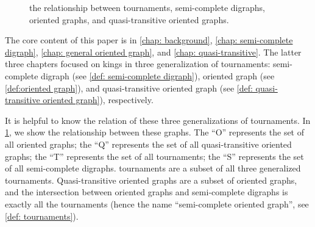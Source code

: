 \begin{figure}
  \centering
  \caption{the relationship between tournaments,
    semi-complete digraphs, oriented graphs,
    and quasi-transitive oriented graphs.}
  \label{fig: generalized tournaments relationship}  %
\end{figure}

The core content of this paper is in
\cref{chap: background}, \cref{chap: semi-complete digraph},
\cref{chap: general oriented graph},
and \cref{chap: quasi-transitive}.
The latter three chapters focused on kings in
three generalization of tournaments:
semi-complete digraph (see \cref{def: semi-complete digraph}),
oriented graph (see \cref{def:oriented graph}),
and quasi-transitive oriented graph
(see \cref{def: quasi-transitive oriented graph}),
respectively.

It is helpful to know the relation of these
three generalizations of tournaments.
In \cref{fig: generalized tournaments relationship},
we show the relationship between these graphs.
The ``O'' represents the set of all oriented graphs;
the ``Q'' represents the set of all quasi-transitive oriented graphs;
the ``T'' represents the set of all tournaments;
the ``S'' represents the set of all semi-complete digraphs.
tournaments are a subset of all three generalized tournaments.
Quasi-transitive oriented graphs are a subset of oriented graphs,
and the intersection between oriented graphs and
semi-complete digraphs is exactly all the tournaments
(hence the name ``semi-complete oriented graph'',
see \cref{def: tournaments}).


